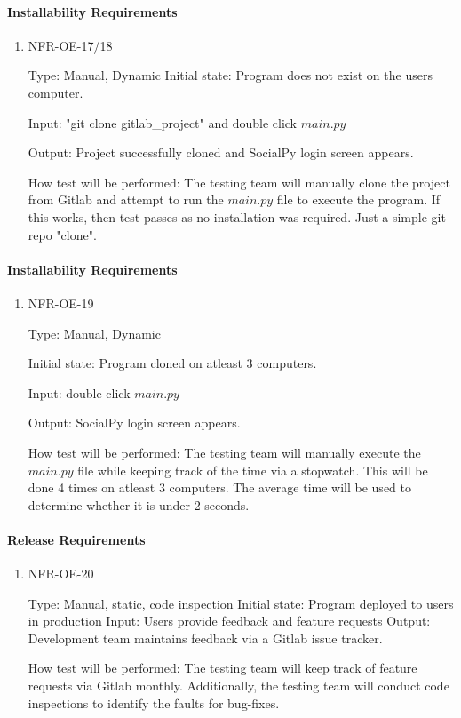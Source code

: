 \documentclass[12pt, titlepage]{article}
\begin{document}
  \paragraph{Installability Requirements}
\begin{enumerate}
    \item{NFR-OE-17/18 \\}
    
    Type: Manual, Dynamic
    Initial state: Program does not exist on the users computer.
    
    Input: "git clone gitlab\_project" and double click $main.py$
    
    Output: Project successfully cloned and SocialPy login screen appears.
    
    How test will be performed: The testing team will manually clone the project from Gitlab and attempt to run the $main.py$ file to execute the program. If this works, then test passes as no installation was required. Just a simple git repo "clone".
    

 \end{enumerate} 
 
   \paragraph{Installability Requirements}
\begin{enumerate}
    \item{NFR-OE-19 \\}
    
    Type: Manual, Dynamic
    
    Initial state: Program cloned on atleast 3 computers.
    
    Input: double click $main.py$
    
    Output: SocialPy login screen appears.
    
    How test will be performed: The testing team will manually execute the $main.py$ file while keeping track of the time via a stopwatch. This will be done 4 times on atleast 3 computers. The average time will be used to determine whether it is under 2 seconds.
    

 \end{enumerate} 
 
    \paragraph{Release Requirements}
\begin{enumerate}
    \item{NFR-OE-20 \\}
    
    Type: Manual, static, code inspection
    Initial state: Program deployed to users in production
    Input: Users provide feedback and feature requests
    Output: Development team maintains feedback via a Gitlab issue tracker.
    
    How test will be performed: The testing team will keep track of feature requests via Gitlab monthly. Additionally, the testing team will conduct code inspections to identify the faults for bug-fixes.
    

 \end{enumerate} 
\end{document}
